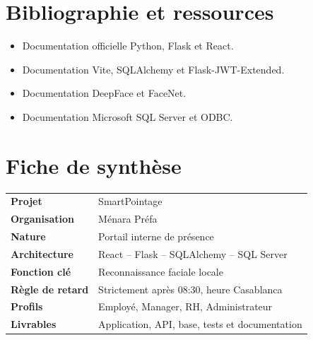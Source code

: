 \documentclass[11pt,a4paper,oneside]{report}
\begin{document}
\chapter*{Bibliographie et ressources}
\begin{itemize}
\item Documentation officielle Python, Flask et React.
\item Documentation Vite, SQLAlchemy et Flask-JWT-Extended.
\item Documentation DeepFace et FaceNet.
\item Documentation Microsoft SQL Server et ODBC.
\end{itemize}
\chapter*{Fiche de synthèse}
\begin{center}\begin{tabular}{>{\bfseries}p{5cm}p{8cm}}
Projet & SmartPointage\\
Organisation & Ménara Préfa\\
Nature & Portail interne de présence\\
Architecture & React -- Flask -- SQLAlchemy -- SQL Server\\
Fonction clé & Reconnaissance faciale locale\\
Règle de retard & Strictement après 08:30, heure Casablanca\\
Profils & Employé, Manager, RH, Administrateur\\
Livrables & Application, API, base, tests et documentation
\end{tabular}\end{center}
\end{document}
